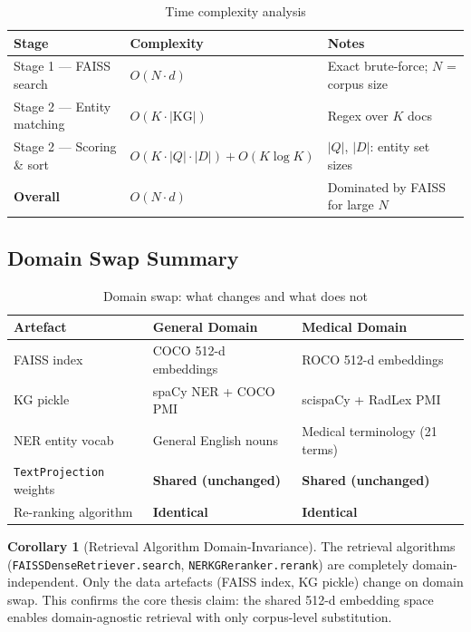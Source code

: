 \documentclass[12pt,a4paper]{article}
\theoremstyle{definition}
\newtheorem{corollary}[theorem]{Corollary}
\theoremstyle{remark}
\begin{document}
\begin{table}[H]
\centering
\caption{Time complexity analysis}
\begin{tabularx}{\textwidth}{lXl}
\toprule
Stage & Complexity & Notes \\
\midrule
Stage 1 --- FAISS search & $O(N \cdot d)$ & Exact brute-force; $N$ = corpus size \\
Stage 2 --- Entity matching & $O(K \cdot |\text{KG}|)$ & Regex over $K$ docs \\
Stage 2 --- Scoring \& sort & $O(K \cdot |Q| \cdot |D|) + O(K \log K)$ & $|Q|$, $|D|$: entity set sizes \\
\textbf{Overall} & $O(N \cdot d)$ & Dominated by FAISS for large $N$ \\
\bottomrule
\end{tabularx}
\end{table}

\subsection{Domain Swap Summary}

\begin{table}[H]
\centering
\caption{Domain swap: what changes and what does not}
\begin{tabularx}{\textwidth}{lXX}
\toprule
Artefact & General Domain & Medical Domain \\
\midrule
FAISS index & COCO 512-d embeddings & ROCO 512-d embeddings \\
KG pickle & spaCy NER + COCO PMI & scispaCy + RadLex PMI \\
NER entity vocab & General English nouns & Medical terminology (21 terms) \\
\texttt{TextProjection} weights & \textbf{Shared (unchanged)} & \textbf{Shared (unchanged)} \\
Re-ranking algorithm & \textbf{Identical} & \textbf{Identical} \\
\bottomrule
\end{tabularx}
\end{table}

\begin{corollary}[Retrieval Algorithm Domain-Invariance]
The retrieval algorithms (\texttt{FAISSDenseRetriever.search},
\texttt{NERKGReranker.rerank}) are completely domain-independent.
Only the data artefacts (FAISS index, KG pickle) change on domain swap.
This confirms the core thesis claim: the shared 512-d embedding space
enables domain-agnostic retrieval with only corpus-level substitution.
\end{corollary}
\end{document}
